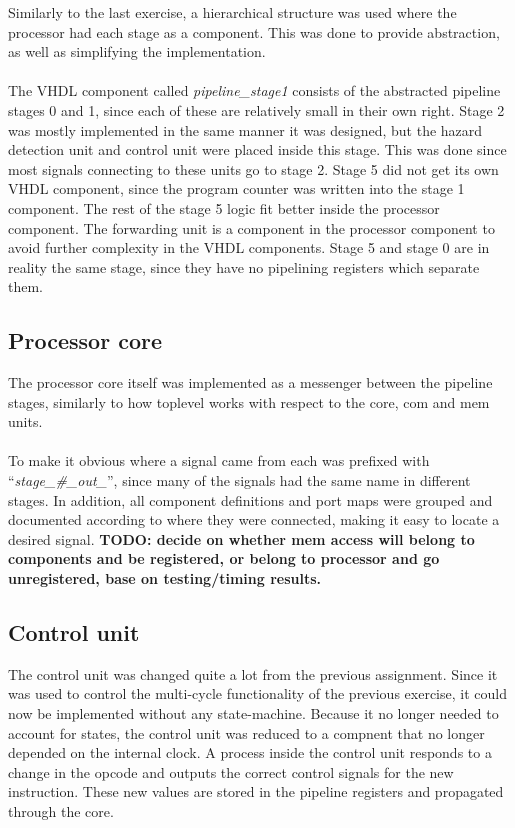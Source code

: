 Similarly to the last exercise, a hierarchical structure was used where the
processor had each stage as a component. This was done to provide abstraction,
as well as simplifying the implementation.
\paragraph*{}
The VHDL component called \emph{pipeline\_stage1} consists of the abstracted
pipeline stages 0 and 1, since each of these are relatively small in their own
right. Stage 2 was mostly implemented in the same manner it was designed, but the hazard
detection unit and control unit were placed inside this stage. This was done
since most signals connecting to these units go to stage 2. Stage 5 did not get
its own VHDL component, since the program counter was written into the stage 1
component.
The rest of the stage 5 logic fit better inside the processor
component. The forwarding unit is a component in the processor component to
avoid further complexity in the VHDL components.  Stage 5 and stage 0 are in reality the same stage, since they have no pipelining registers which separate them.

\subsection{Processor core}
The processor core itself was implemented as a messenger between the pipeline
stages, similarly to how toplevel works with respect to the core, com and mem
units.
\paragraph*{}
To make it obvious where a signal came from each was prefixed with
``\emph{stage\_\#\_out\_}'', since many of the signals had the same name in
different stages. In addition, all component definitions and port maps were
grouped and documented according to where they were connected, making it easy to
locate a desired signal.\newline
\textbf{TODO: decide on whether mem access will belong to components and be registered, or belong to processor and go unregistered, base on testing/timing results.}

\subsection{Control unit}
The control unit was changed quite a lot from the previous assignment. Since it was used to control the multi-cycle functionality of the previous exercise, it could now be implemented without any state-machine. Because it no longer needed to account for states, the control unit was reduced to a compnent that no longer depended on the internal clock. A process inside the control unit responds to a change in the opcode and outputs the correct control signals for the new instruction. These new values are stored in the pipeline registers and propagated through the core.

